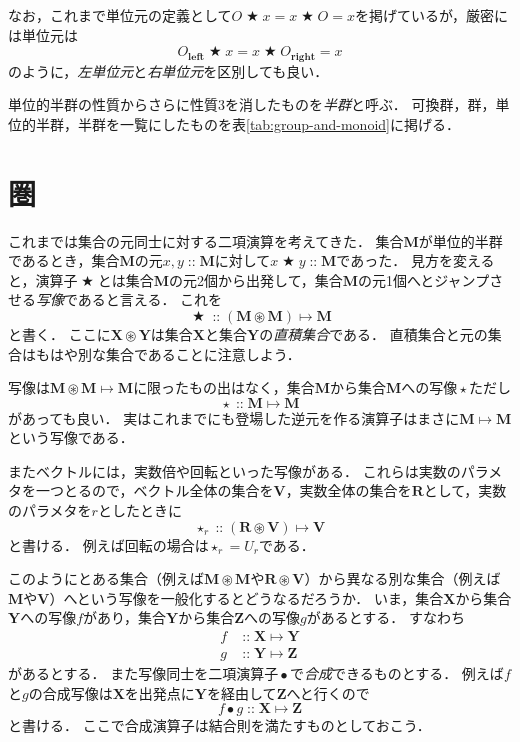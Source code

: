 \documentclass[twocolumn]{jsbook}
\newcommand{\keyword}[1]{\emph{#1}}
\newcommand{\mathKeyword}[1]{\mathbf{#1}}
\DeclareMathOperator{\mathAnyBinaryOperator}{\bigstar}
\DeclareMathOperator{\mathAnyUnaryOperator}{\star}
\DeclareMathOperator{\mathCompose}{\bullet}
\DeclareMathOperator{\mathIn}{::}
\DeclareMathOperator{\mathMapsTo}{\mapsto}
\DeclareMathOperator{\mathSetTimes}{\circledast}
\newcommand{\mathLeft}{\mathKeyword{left}}
\newcommand{\mathRight}{\mathKeyword{right}}
\newcommand{\mathSet}[1]{\mathbf{#1}}
\newcommand{\mathMorph}[2]{#1\mathMapsTo#2}
\begin{document}
なお，これまで単位元の定義として$O\mathAnyBinaryOperator x=x\mathAnyBinaryOperator O=x$を掲げているが，厳密には単位元は$$O_\mathLeft\mathAnyBinaryOperator x=x\mathAnyBinaryOperator O_\mathRight=x$$のように，\keyword{左単位元}と\keyword{右単位元}を区別しても良い．

単位的半群の性質からさらに性質3を消したものを\keyword{半群}と呼ぶ．
可換群，群，単位的半群，半群を一覧にしたものを表\ref{tab:group-and-monoid}に掲げる．

\section{圏}

これまでは集合の元同士に対する二項演算を考えてきた．
集合$\mathSet{M}$が単位的半群であるとき，集合$\mathSet{M}$の元$x,y\mathIn\mathSet{M}$に対して$x\mathAnyBinaryOperator y\mathIn\mathSet{M}$であった．
見方を変えると，演算子$\mathAnyBinaryOperator$とは集合$\mathSet{M}$の元2個から出発して，集合$\mathSet{M}$の元1個へとジャンプさせる\keyword{写像}であると言える．
これを$$\mathAnyBinaryOperator\mathIn{}\mathMorph{(\mathSet{M}\mathSetTimes\mathSet{M})}{\mathSet{M}}$$と書く．
ここに$\mathSet{X}\mathSetTimes\mathSet{Y}$は集合$\mathSet{X}$と集合$\mathSet{Y}$の\keyword{直積集合}である．
直積集合と元の集合はもはや別な集合であることに注意しよう．

写像は$\mathMorph{\mathSet{M}\mathSetTimes\mathSet{M}}{\mathSet{M}}$に限ったもの出はなく，集合$\mathSet{M}$から集合$\mathSet{M}$への写像$\mathAnyUnaryOperator$ただし$$\mathAnyUnaryOperator\mathIn\mathMorph{\mathSet{M}}{\mathSet{M}}$$があっても良い．
実はこれまでにも登場した逆元を作る演算子はまさに$\mathMorph{\mathSet{M}}{\mathSet{M}}$という写像である．

またベクトルには，実数倍や回転といった写像がある．
これらは実数のパラメタを一つとるので，ベクトル全体の集合を$\mathSet{V}$，実数全体の集合を$\mathSet{R}$として，実数のパラメタを$r$としたときに$$\mathAnyUnaryOperator_r\mathIn{}\mathMorph{(\mathSet{R}\mathSetTimes\mathSet{V})}{\mathSet{V}}$$と書ける．
例えば回転の場合は$\mathAnyUnaryOperator_r=U_r$である．

このようにとある集合（例えば$\mathSet{M}\mathSetTimes\mathSet{M}$や$\mathSet{R}\mathSetTimes\mathSet{V}$）から異なる別な集合（例えば$\mathSet{M}$や$\mathSet{V}$）へという写像を一般化するとどうなるだろうか．
いま，集合$\mathSet{X}$から集合$\mathSet{Y}$への写像$f$があり，集合$\mathSet{Y}$から集合$\mathSet{Z}$への写像$g$があるとする．
すなわち
\begin{align*}
f&\mathIn\mathMorph{\mathSet{X}}{\mathSet{Y}}\\
g&\mathIn\mathMorph{\mathSet{Y}}{\mathSet{Z}}
\end{align*}
があるとする．
また写像同士を二項演算子$\mathCompose$で\keyword{合成}できるものとする．
例えば$f$と$g$の合成写像は$\mathSet{X}$を出発点に$\mathSet{Y}$を経由して$\mathSet{Z}$へと行くので$$f\mathCompose g\mathIn\mathMorph{\mathSet{X}}{\mathSet{Z}}$$と書ける．
ここで合成演算子は結合則を満たすものとしておこう．
\end{document}
